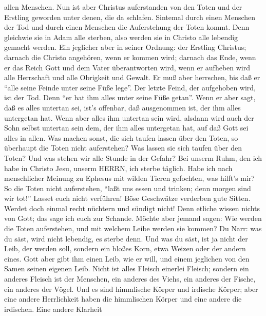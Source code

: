 allen Menschen.  Nun ist aber Christus auferstanden von den
Toten und der Erstling geworden unter denen, die da schlafen.
 Sintemal durch einen Menschen der Tod und durch einen
Menschen die Auferstehung der Toten kommt.  Denn gleichwie
sie in Adam alle sterben, also werden sie in Christo alle lebendig
gemacht werden.  Ein jeglicher aber in seiner Ordnung: der
Erstling Christus; darnach die Christo angehören, wenn er kommen wird;
 darnach das Ende, wenn er das Reich Gott und dem Vater
überantworten wird, wenn er aufheben wird alle Herrschaft und alle
Obrigkeit und Gewalt.  Er muß aber herrschen, bis daß er
``alle seine Feinde unter seine Füße lege''.  Der letzte
Feind, der aufgehoben wird, ist der Tod.  Denn ``er hat ihm
alles unter seine Füße getan''. Wenn er aber sagt, daß es alles untertan
sei, ist's offenbar, daß ausgenommen ist, der ihm alles untergetan hat.
 Wenn aber alles ihm untertan sein wird, alsdann wird auch
der Sohn selbst untertan sein dem, der ihm alles untergetan hat, auf daß
Gott sei alles in allen.  Was machen sonst, die sich taufen
lassen über den Toten, so überhaupt die Toten nicht auferstehen? Was
lassen sie sich taufen über den Toten?  Und was stehen wir
alle Stunde in der Gefahr?  Bei unserm Ruhm, den ich habe
in Christo Jesu, unserm HERRN, ich sterbe täglich.  Habe
ich nach menschlicher Meinung zu Ephesus mit wilden Tieren gefochten,
was hilft's mir? So die Toten nicht auferstehen, ``laßt uns essen und
trinken; denn morgen sind wir tot!''  Lasset euch nicht
verführen! Böse Geschwätze verderben gute Sitten.  Werdet
doch einmal recht nüchtern und sündigt nicht! Denn etliche wissen nichts
von Gott; das sage ich euch zur Schande.  Möchte aber
jemand sagen: Wie werden die Toten auferstehen, und mit welchem Leibe
werden sie kommen?  Du Narr: was du säst, wird nicht
lebendig, es sterbe denn.  Und was du säst, ist ja nicht
der Leib, der werden soll, sondern ein bloßes Korn, etwa Weizen oder der
andern eines.  Gott aber gibt ihm einen Leib, wie er will,
und einem jeglichen von den Samen seinen eigenen Leib. 
Nicht ist alles Fleisch einerlei Fleisch; sondern ein anderes Fleisch
ist der Menschen, ein anderes des Viehs, ein anderes der Fische, ein
anderes der Vögel.  Und es sind himmlische Körper und
irdische Körper; aber eine andere Herrlichkeit haben die himmlischen
Körper und eine andere die irdischen.  Eine andere Klarheit
